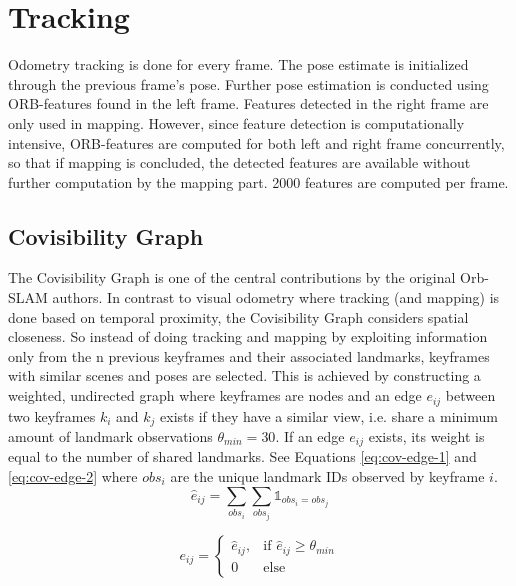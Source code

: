\documentclass[a4paper, 10pt]{article}
\begin{document}
\section{Tracking}
\label{sec:orgd3e425f}
Odometry tracking is done for every frame. The pose estimate is initialized through the previous frame’s pose. Further pose estimation is conducted using ORB-features found in the left frame.
Features detected in the right frame are only used in mapping. However, since feature detection is computationally intensive, ORB-features are computed for both left and right frame concurrently, 
so that if mapping is concluded, the detected features are available without further computation by the mapping part. 2000 features are computed per frame. 

\subsection{Covisibility Graph}
\label{sec:orge25ac13}

The Covisibility Graph is one of the central contributions by the original Orb-SLAM authors. In contrast to visual odometry where tracking (and mapping) is done based on temporal proximity, the Covisibility Graph 
considers spatial closeness.
So instead of doing tracking and mapping by exploiting information only from the n previous keyframes and their associated landmarks, keyframes with similar scenes and poses are selected.
This is achieved by constructing a weighted, undirected graph where keyframes are nodes and an edge \(e_{ij}\) between two keyframes \(k_i\) and \(k_j\) exists if they have a similar view, 
i.e. share a minimum amount of landmark observations \(\theta_{min}=30\).
If an edge \(e_{ij}\) exists, its weight is equal to the number of shared landmarks. See Equations \ref{eq:cov-edge-1} and \ref{eq:cov-edge-2} where \(obs_i\) are the unique landmark IDs observed by keyframe \(i\).
\begin{equation}
\label{eq:cov-edge-1}
\widehat{e}_{ij} = \sum_{obs_i}\sum_{obs_j}\mathbb{1}_{obs_i=obs_j}
\end{equation}

\begin{equation}
\label{eq:cov-edge-2}
e_{ij} = 
\begin{cases}
\widehat{e}_{ij}, & \text{if } \widehat{e}_{ij} \geq \theta_{min} \\
0 & \text{else}
\end{cases}
\end{equation}
\end{document}
